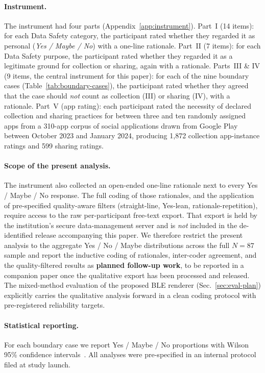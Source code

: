 \documentclass[11pt,a4paper]{article}
\begin{document}
\paragraph{Instrument.}
The instrument had four parts (Appendix~\ref{app:instrument}).
Part~I (14 items): for each Data Safety category, the participant
rated whether they regarded it as personal (\emph{Yes / Maybe / No})
with a one-line rationale. Part~II (7 items): for each Data Safety
purpose, the participant rated whether they regarded it as a
legitimate ground for collection or sharing, again with a rationale.
Parts~III \& IV (9 items, the central instrument for this paper):
for each of the nine boundary cases (Table~\ref{tab:boundary-cases}),
the participant rated whether they agreed that the case should
\emph{not} count as collection (III) or sharing (IV), with a
rationale. Part~V (app rating): each participant rated the
necessity of declared collection and sharing practices for between
three and ten randomly assigned apps from a 310-app corpus of social
applications drawn from Google Play between October 2023 and
January 2024, producing 1{,}872 collection app-instance ratings and
599 sharing ratings.



\paragraph{Scope of the present analysis.}
The instrument also collected an open-ended one-line rationale next
to every Yes / Maybe / No response. The full coding of those
rationales, and the application of pre-specified quality-aware
filters (straight-line, Yes-lean, rationale-repetition), require
access to the raw per-participant free-text export. That export is
held by the institution's secure data-management server and is
\emph{not} included in the de-identified release accompanying this
paper. We therefore restrict the present analysis to the
aggregate Yes / No / Maybe distributions across the full
$N{=}87$ sample and report the inductive coding of rationales,
inter-coder agreement, and the quality-filtered results as
\textbf{planned follow-up work}, to be reported in a companion paper
once the qualitative export has been processed and released. The
mixed-method evaluation of the proposed BLE renderer
(Sec.~\ref{sec:eval-plan}) explicitly carries the qualitative
analysis forward in a clean coding protocol with pre-registered
reliability targets.

\paragraph{Statistical reporting.}
For each boundary case we report Yes / Maybe / No proportions with
Wilson 95\% confidence intervals~\citep{wilson:1927}. All analyses
were pre-specified in an internal protocol filed at study launch.
\end{document}
